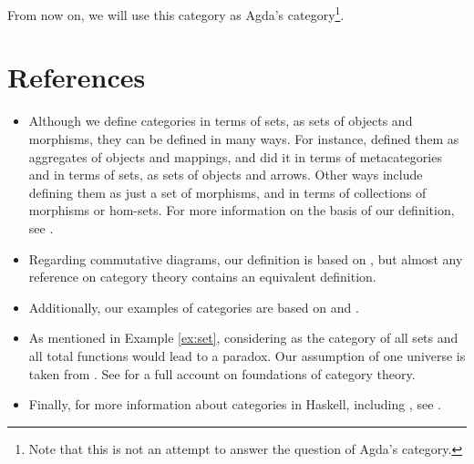 From now on, we will use this category as Agda's
category\footnote{Note that this is not an attempt to answer the
  question of Agda's category.}.

\section{References}
\label{sec:categories-references}

\begin{itemize}
\item

  Although we define categories in terms of sets, as sets of objects
  and morphisms, they can be defined in many ways. For instance,
  \textcite{eilenberg-maclane-1945} defined them as aggregates of
  objects and mappings, and \textcite{maclane-1998} did it in terms of
  metacategories and in terms of sets, as sets of objects and arrows.
  Other ways include defining them as just a set of morphisms, and in
  terms of collections of morphisms or hom-sets. For more information
  on the basis of our definition, see
  \parencites[7--8,~10]{maclane-1998}[418]{poigne-1992}.

\item

  Regarding commutative diagrams, our definition is based on
  \parencites[8]{maclane-1998}[434--435]{poigne-1992}, but almost any
  reference on category theory contains an equivalent definition.

\item

  Additionally, our examples of categories are based on
  \parencites[8--9,~10--12]{maclane-1998}[§~1.2.2]{poigne-1992} and
  \parencites{pierce-1991}{bird-demoor-1997}{marquis-2013}.

\item

  As mentioned in Example \ref{ex:set}, considering \set as the
  category of all sets and all total functions would lead to a
  paradox. Our assumption of one universe is taken from
  \parencite[12]{maclane-1998}. See \parencite[§~I.6]{maclane-1998}
  for a full account on foundations of category theory.

\item

  Finally, for more information about categories in Haskell, including
  \hask, see \parencites[74]{elkins-2009}[49--51]{yorgey-2009}.

\end{itemize}

\clearemptydoublepage
